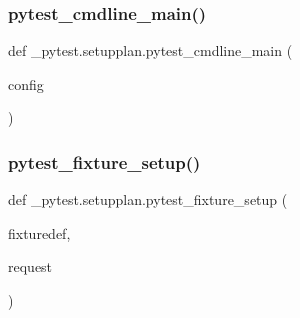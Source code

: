 \subsubsection{\texorpdfstring{pytest\+\_\+cmdline\+\_\+main()}{pytest\_cmdline\_main()}}
{\footnotesize\ttfamily def \+\_\+pytest.\+setupplan.\+pytest\+\_\+cmdline\+\_\+main (\begin{DoxyParamCaption}\item[{}]{config }\end{DoxyParamCaption})}

\mbox{\label{namespace__pytest_1_1setupplan_aa46528d134f83e8a0d502004f4ea6d4a}} 
\subsubsection{\texorpdfstring{pytest\+\_\+fixture\+\_\+setup()}{pytest\_fixture\_setup()}}
{\footnotesize\ttfamily def \+\_\+pytest.\+setupplan.\+pytest\+\_\+fixture\+\_\+setup (\begin{DoxyParamCaption}\item[{}]{fixturedef,  }\item[{}]{request }\end{DoxyParamCaption})}

